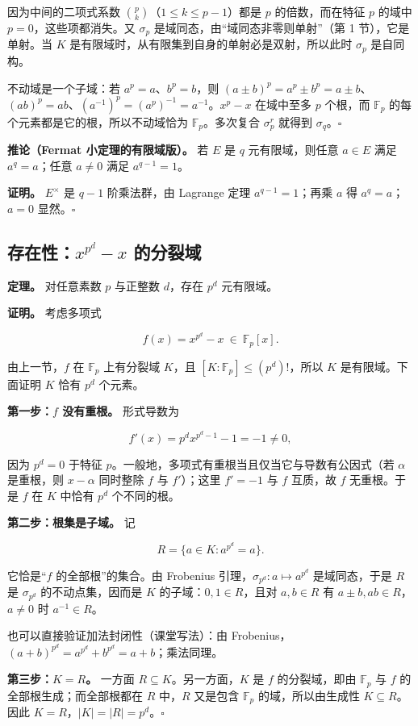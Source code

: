 因为中间的二项式系数 $\binom{p}{k}$（$1\le k\le p-1$）都是 $p$ 的倍数，而在特征 $p$ 的域中 $p=0$，这些项都消失。又 $\sigma_p$ 是域同态，由“域同态非零则单射”（第 1 节），它是单射。当 $K$ 是有限域时，从有限集到自身的单射必是双射，所以此时 $\sigma_p$ 是自同构。

不动域是一个子域：若 $a^p=a$、$b^p=b$，则 $(a\pm b)^p=a^p\pm b^p=a\pm b$、$(ab)^p=ab$、$(a^{-1})^p=(a^p)^{-1}=a^{-1}$。$x^p-x$ 在域中至多 $p$ 个根，而 $\mathbb F_p$ 的每个元素都是它的根，所以不动域恰为 $\mathbb F_p$。多次复合 $\sigma_p^r$ 就得到 $\sigma_q$。$\square$

\textbf{推论（Fermat 小定理的有限域版）。} 若 $E$ 是 $q$ 元有限域，则任意 $a\in E$ 满足 $a^q=a$；任意 $a\ne0$ 满足 $a^{q-1}=1$。

\textbf{证明。} $E^\times$ 是 $q-1$ 阶乘法群，由 Lagrange 定理 $a^{q-1}=1$；再乘 $a$ 得 $a^q=a$；$a=0$ 显然。$\square$

\subsection{存在性：$x^{p^d}-x$ 的分裂域}


\textbf{定理。} 对任意素数 $p$ 与正整数 $d$，存在 $p^d$ 元有限域。

\textbf{证明。} 考虑多项式

\[
f(x)=x^{p^d}-x\ \in\ \mathbb F_p[x].
\]

由上一节，$f$ 在 $\mathbb F_p$ 上有分裂域 $K$，且 $[K:\mathbb F_p]\le(p^d)!$，所以 $K$ 是有限域。下面证明 $K$ 恰有 $p^d$ 个元素。

\textbf{第一步：$f$ 没有重根。} 形式导数为

\[
f'(x)=p^d x^{p^d-1}-1=-1\ne0,
\]

因为 $p^d=0$ 于特征 $p$。一般地，多项式有重根当且仅当它与导数有公因式（若 $\alpha$ 是重根，则 $x-\alpha$ 同时整除 $f$ 与 $f'$）；这里 $f'=-1$ 与 $f$ 互质，故 $f$ 无重根。于是 $f$ 在 $K$ 中恰有 $p^d$ 个不同的根。

\textbf{第二步：根集是子域。} 记

\[
R=\{a\in K: a^{p^d}=a\}.
\]

它恰是“$f$ 的全部根”的集合。由 Frobenius 引理，$\sigma_{p^d}:a\mapsto a^{p^d}$ 是域同态，于是 $R$ 是 $\sigma_{p^d}$ 的不动点集，因而是 $K$ 的子域：$0,1\in R$，且对 $a,b\in R$ 有 $a\pm b,ab\in R$，$a\ne0$ 时 $a^{-1}\in R$。

也可以直接验证加法封闭性（课堂写法）：由 Frobenius，$(a+b)^{p^d}=a^{p^d}+b^{p^d}=a+b$；乘法同理。

\textbf{第三步：$K=R$。} 一方面 $R\subseteq K$。另一方面，$K$ 是 $f$ 的分裂域，即由 $\mathbb F_p$ 与 $f$ 的全部根生成；而全部根都在 $R$ 中，$R$ 又是包含 $\mathbb F_p$ 的域，所以由生成性 $K\subseteq R$。因此 $K=R$，$|K|=|R|=p^d$。$\square$

